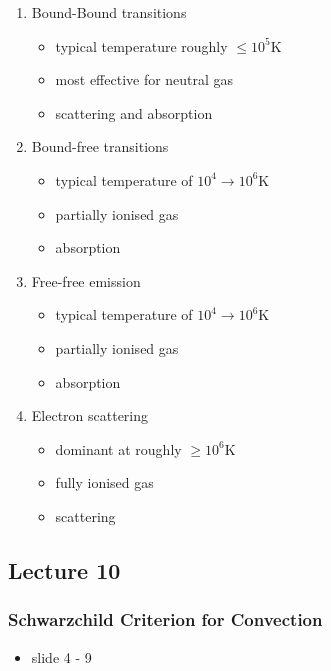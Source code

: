 \documentclass[a4paper,11pt,normalem]{article}
\begin{document}
\begin{enumerate}
\def\labelenumi{\arabic{enumi}.}
\item
  Bound-Bound transitions

  \begin{itemize}
  \item
    typical temperature roughly \(\leq 10^5\)K
  \item
    most effective for neutral gas
  \item
    scattering and absorption
  \end{itemize}
\item
  Bound-free transitions

  \begin{itemize}
  \item
    typical temperature of \(10^4 \to 10^6\)K
  \item
    partially ionised gas
  \item
    absorption
  \end{itemize}
\item
  Free-free emission

  \begin{itemize}
  \item
    typical temperature of \(10^4 \to 10^6\)K
  \item
    partially ionised gas
  \item
    absorption
  \end{itemize}
\item
  Electron scattering

  \begin{itemize}
  \item
    dominant at roughly \(\geq 10^6\)K
  \item
    fully ionised gas
  \item
    scattering
  \end{itemize}
\end{enumerate}

\subsection{Lecture 10}\label{lecture-10}

\subsubsection{Schwarzchild Criterion for
Convection}\label{schwarzchild-criterion-for-convection}

\begin{itemize}
\item
  slide 4 - 9
\end{itemize}
\end{document}
